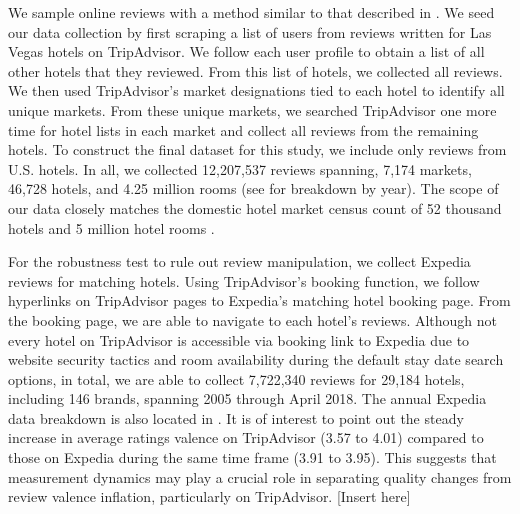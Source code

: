 \documentclass[12pt, leqno]{article}
\begin{document}
We sample online reviews with a method similar to that described in \citet{wang2018and}. We seed our data collection by first scraping a list of users from reviews written for Las Vegas hotels on TripAdvisor. We follow each user profile to obtain a list of all other hotels that they reviewed. From this list of hotels, we collected all reviews. We then used TripAdvisor's market designations tied to each hotel to identify all unique markets. From these unique markets, we searched TripAdvisor one more time for hotel lists in each market and collect all reviews from the remaining hotels. To construct the final dataset for this study, we include only reviews from U.S. hotels. In all, we collected 12,207,537 reviews spanning, 7,174 markets, 46,728 hotels, and 4.25 million rooms (see  for breakdown by year). The scope of our data closely matches the domestic hotel market census count of 52 thousand hotels and 5 million hotel rooms \citep{hotelnews2015}. 

For the robustness test to rule out review manipulation, we collect Expedia reviews for matching hotels. Using TripAdvisor's booking function, we follow hyperlinks on TripAdvisor pages to Expedia's matching hotel booking page. From the booking page, we are able to navigate to each hotel's reviews. Although not every hotel on TripAdvisor is accessible via booking link to Expedia due to website security tactics and room availability during the default stay date search options, in total, we are able to collect 7,722,340 reviews for 29,184 hotels, including 146 brands, spanning 2005 through April 2018. The annual Expedia data breakdown is also located in . It is of interest to point out the steady increase in average ratings valence on TripAdvisor (3.57 to 4.01) compared to those on Expedia during the same time frame (3.91 to 3.95). This suggests that measurement dynamics may play a crucial role in separating quality changes from review valence inflation, particularly on TripAdvisor. 
[Insert  here]
\end{document}

